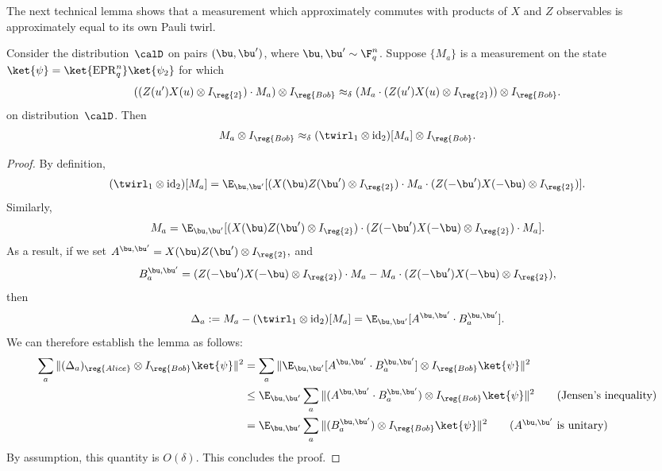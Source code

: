 The next technical lemma shows that a measurement which approximately commutes with products of $X$ and $Z$ observables
is approximately equal to its own Pauli twirl.

\begin{lemma}\label{lem:commute-to-twirl}
Consider the distribution~$\calD$ on pairs $(\bu, \bu')$, where $\bu, \bu' \sim \F_q^n$.
Suppose $\{M_{a}\}$ is a measurement on the state $\ket{\psi} = \ket{\mathrm{EPR}_q^n} \ket{\psi_2}$ for which
\begin{equation*}
((Z(u') X(u)\otimes I_{\reg{2}}) \cdot M_{a}) \otimes I_{\reg{Bob}}
\approx_{\delta} (M_{a} \cdot (Z(u') X(u)\otimes I_{\reg{2}})) \otimes I_{\reg{Bob}}.
\end{equation*}
on distribution~$\calD$. Then
\begin{equation*}
M_{a} \otimes I_{\reg{Bob}} \approx_{\delta} (\twirl_1 \otimes \mathrm{id}_{\mathrm{2}})[M_{a}] \otimes I_{\reg{Bob}}.
\end{equation*}
\end{lemma}
\begin{proof}
By definition,
\begin{equation*}
(\twirl_1 \otimes \mathrm{id}_{\mathrm{2}})[M_{a}]
= \E_{\bu, \bu'} [(X(\bu) Z(\bu') \otimes I_{\reg{2}}) \cdot M_a \cdot (Z(-\bu') X(-\bu) \otimes I_{\reg{2}})].
\end{equation*}
Similarly,
\begin{equation*}
M_{a}
= \E_{\bu, \bu'} [(X(\bu) Z(\bu') \otimes I_{\reg{2}}) \cdot (Z(-\bu') X(-\bu) \otimes I_{\reg{2}}) \cdot M_a].
\end{equation*}
As a result, if we set
$
A^{\bu, \bu'} = X(\bu) Z(\bu') \otimes I_{\reg{2}},
$
and
\begin{equation*}
B^{\bu, \bu'}_a = (Z(-\bu') X(-\bu) \otimes I_{\reg{2}}) \cdot M_a - M_a \cdot (Z(-\bu') X(-\bu) \otimes I_{\reg{2}}),
\end{equation*}
then
\begin{equation*}
\Delta_a:=
M_a - (\twirl_1 \otimes \mathrm{id}_{\mathrm{2}})[M_a]
= \E_{\bu, \bu'} [A^{\bu, \bu'} \cdot B^{\bu, \bu'}_a].
\end{equation*}
We can therefore establish the lemma as follows:
\begin{align*}
\sum_a \Vert (\Delta_a)_{\reg{Alice}} \otimes I_{\reg{Bob}} \ket{\psi} \Vert^2
& = \sum_a \Vert \E_{\bu, \bu'} [A^{\bu, \bu'} \cdot B^{\bu, \bu'}_a] \otimes I_{\reg{Bob}} \ket{\psi} \Vert^2\\
& \leq \E_{\bu, \bu'} \sum_a \Vert (A^{\bu, \bu'} \cdot B^{\bu, \bu'}_a) \otimes I_{\reg{Bob}} \ket{\psi} \Vert^2\tag{Jensen's inequality}\\
& = \E_{\bu, \bu'} \sum_a \Vert (B^{\bu, \bu'}_a) \otimes I_{\reg{Bob}} \ket{\psi} \Vert^2 \tag{$A^{\bu, \bu'}$ is unitary}
\end{align*}
By assumption, this quantity is $O(\delta)$. This concludes the proof.
\end{proof}


